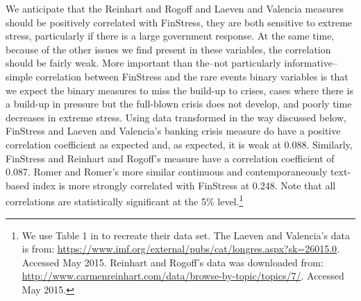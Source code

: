 \documentclass[]{article}
\begin{document}
We anticipate that the Reinhart and Rogoff and Laeven and Valencia measures should be positively correlated with FinStress, they are both sensitive to extreme stress, particularly if there is a large government response. At the same time, because of the other issues we find present in these variables, the correlation should be fairly weak. More important than the--not particularly informative--simple correlation between FinStress and the rare events binary variables is that we expect the binary measures to miss the build-up to crises, cases where there is a build-up in pressure but the full-blown crisis does not develop, and poorly time decreases in extreme stress. Using data transformed in the way discussed below, FinStress and Laeven and Valencia's banking crisis measure do have a positive correlation coefficient as expected and, as expected, it is weak at 0.088. Similarly, FinStress and Reinhart and Rogoff's measure have a correlation coefficient of 0.087. Romer and Romer's more similar continuous and contemporaneously text-based index is more strongly correlated with FinStress at 0.248. Note that all correlations are statistically significant at the 5\% level.\footnote{We use Table 1 in \cite{Romer2015} to recreate their data set. The Laeven and Valencia's data is from: \url{https://www.imf.org/external/pubs/cat/longres.aspx?sk=26015.0}.
  Accessed May 2015. Reinhart and Rogoff's data was downloaded from:
  \url{http://www.carmenreinhart.com/data/browse-by-topic/topics/7/}.
  Accessed May 2015.}

\end{document}
